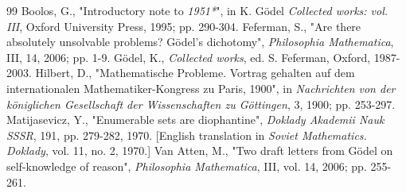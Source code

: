 \documentclass[12pt]{article}
\begin{document}
\begin{thebibliography} {99}
 Boolos, G., "Introductory note to \emph{1951*}", in K. G\"{o}del \emph{Collected works: vol. III}, Oxford University Press, 1995; pp. 290-304.
 Feferman, S., "Are there absolutely unsolvable problems? G\"{o}del's dichotomy", \emph{Philosophia Mathematica}, III, 14, 2006; pp. 1-9.
 G\"{o}del, K., \emph{Collected works}, ed. S. Feferman, Oxford, 1987-2003.
 Hilbert, D., "Mathematische Probleme. Vortrag gehalten auf dem internationalen Mathematiker-Kongress zu Paris, 1900", in \emph{Nachrichten von der k\"{o}niglichen Gesellschaft der Wissenschaften zu G\"{o}ttingen}, 3, 1900; pp. 253-297.
 Matijasevicz, Y., "Enumerable sets are diophantine", \emph{Doklady Akademii Nauk SSSR}, 191, pp. 279-282, 1970. [English translation in \emph{Soviet Mathematics. Doklady}, vol. 11, no. 2, 1970.]
 Van Atten, M., "Two draft letters from G\"{o}del on self-knowledge of reason", \emph{Philosophia Mathematica}, III, vol. 14, 2006; pp. 255-261.
\end{thebibliography}
\end{document}
